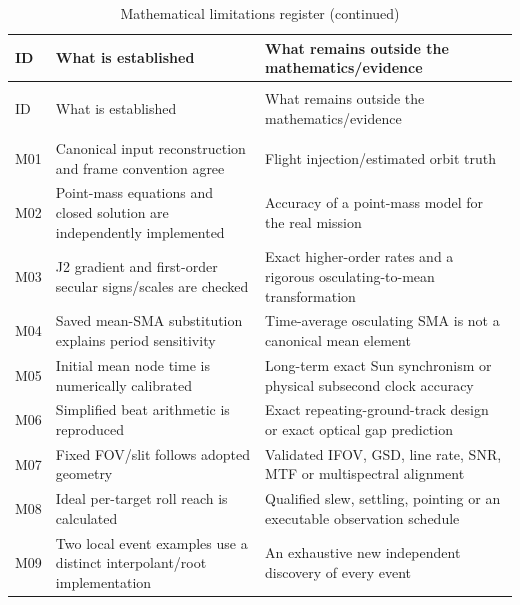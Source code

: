 \documentclass[10pt,a4paper]{article}
\numberwithin{equation}{section}
\begin{document}
\begingroup\fontsize{9.2}{11.6}\selectfont
\setlength{\tabcolsep}{4pt}\renewcommand{\arraystretch}{1.14}
\begin{longtable}{@{}>{\raggedright\arraybackslash}p{}>{\raggedright\arraybackslash}p{}>{\raggedright\arraybackslash}p{}@{}}
\caption{Mathematical limitations register}\label{tab:book-34}\\
\toprule\rowcolor{headerbg}ID & What is established & What remains outside the mathematics/evidence \\\midrule
\endfirsthead
\caption[]{Mathematical limitations register (continued)}\\
\toprule\rowcolor{headerbg}ID & What is established & What remains outside the mathematics/evidence \\\midrule
\endhead
\midrule\multicolumn{3}{r}{\textit{Continued on next page}}\\
\endfoot
\bottomrule\endlastfoot
M01 & Canonical input reconstruction and frame convention agree & Flight injection/estimated orbit truth \\
\rowcolor{rowalt}M02 & Point-mass equations and closed solution are independently implemented & Accuracy of a point-mass model for the real mission \\
M03 & J2 gradient and first-order secular signs/scales are checked & Exact higher-order rates and a rigorous osculating-to-mean transformation \\
\rowcolor{rowalt}M04 & Saved mean-SMA substitution explains period sensitivity & Time-average osculating SMA is not a canonical mean element \\
M05 & Initial mean node time is numerically calibrated & Long-term exact Sun synchronism or physical subsecond clock accuracy \\
\rowcolor{rowalt}M06 & Simplified beat arithmetic is reproduced & Exact repeating-ground-track design or exact optical gap prediction \\
M07 & Fixed FOV/slit follows adopted geometry & Validated IFOV, GSD, line rate, SNR, MTF or multispectral alignment \\
\rowcolor{rowalt}M08 & Ideal per-target roll reach is calculated & Qualified slew, settling, pointing or an executable observation schedule \\
M09 & Two local event examples use a distinct interpolant/root implementation & An exhaustive new independent discovery of every event \\

\end{longtable}
\end{document}
